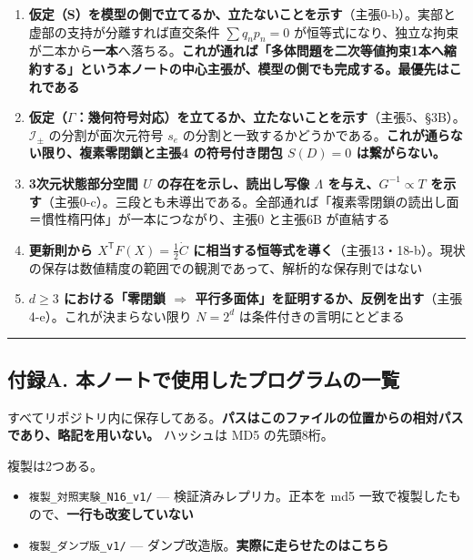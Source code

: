 \documentclass[
  10pt,
]{ltjsarticle}
\providecommand{\tightlist}{%
  \setlength{\itemsep}{0pt}\setlength{\parskip}{0pt}}
\begin{document}
\begin{enumerate}
\def\labelenumi{\arabic{enumi}.}
\tightlist
\item
  \textbf{仮定（S）を模型の側で立てるか、立たないことを示す}（主張0-b）。実部と虚部の支持が分離すれば直交条件
  \(\sum q_np_n=0\)
  が恒等式になり、独立な拘束が二本から\textbf{一本}へ落ちる。\textbf{これが通れば「多体問題を二次等値拘束1本へ縮約する」という本ノートの中心主張が、模型の側でも完成する。最優先はこれである}
\item
  \textbf{仮定（\(\Gamma\)：幾何符号対応）を立てるか、立たないことを示す}（主張5、§3B）。\(\mathcal{I}_\pm\)
  の分割が面次元符号 \(s_e\)
  の分割と一致するかどうかである。\textbf{これが通らない限り、複素零閉鎖と主張4
  の符号付き閉包 \(S(D)=0\) は繋がらない。}
\item
  \textbf{3次元状態部分空間 \(U\) の存在を示し、読出し写像 \(\Lambda\)
  を与え、\(G^{-1}\propto T\)
  を示す}（主張0-c）。三段とも未導出である。全部通れば「複素零閉鎖の読出し面＝慣性楕円体」が一本につながり、主張0
  と主張6B が直結する
\item
  \textbf{更新則から \(X^{\mathsf T}F(X)=\tfrac12\dot C\)
  に相当する恒等式を導く}（主張13・18-b）。現状の保存は数値精度の範囲での観測であって、解析的な保存則ではない
\item
  \textbf{\(d\ge3\) における「零閉鎖 \(\Rightarrow\)
  平行多面体」を証明するか、反例を出す}（主張4-e）。これが決まらない限り
  \(N=2^d\) は条件付きの言明にとどまる
\end{enumerate}

\begin{center}\rule{0.5\linewidth}{0.5pt}\end{center}

\subsection{付録A.
本ノートで使用したプログラムの一覧}\label{ux4ed8ux9332a.-ux672cux30ceux30fcux30c8ux3067ux4f7fux7528ux3057ux305fux30d7ux30edux30b0ux30e9ux30e0ux306eux4e00ux89a7}

すべてリポジトリ内に保存してある。\textbf{パスはこのファイルの位置からの相対パスであり、略記を用いない。}
ハッシュは MD5 の先頭8桁。

複製は2つある。

\begin{itemize}
\tightlist
\item
  \texttt{複製\_対照実験\_N16\_v1/} --- 検証済みレプリカ。正本を md5
  一致で複製したもので、\textbf{一行も改変していない}
\item
  \texttt{複製\_ダンプ版\_v1/} ---
  ダンプ改造版。\textbf{実際に走らせたのはこちら}
\end{itemize}
\end{document}
